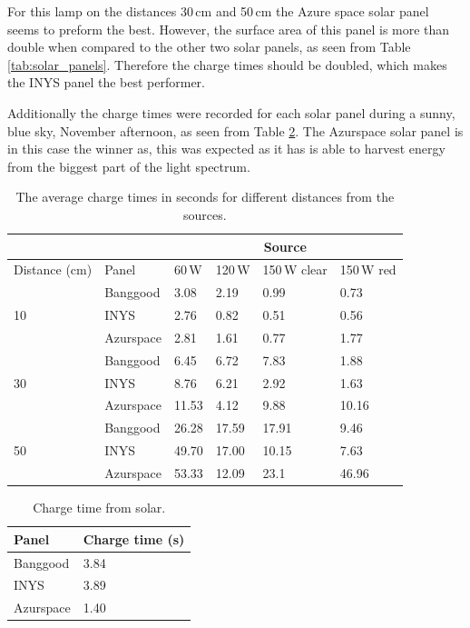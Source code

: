 For this lamp on the distances 30\,cm and 50\,cm the Azure space solar panel seems to preform the best.
However, the surface area of this panel is more than double when compared to the other two solar panels, as seen from Table \ref{tab:solar_panels}.
Therefore the charge times should be doubled, which makes the INYS panel the best performer.

Additionally the charge times were recorded for each solar panel during a sunny, blue sky, November afternoon, as seen from Table \ref{tab:solar_results}.
The Azurspace solar panel is in this case the winner as, this was expected as it has is able to harvest energy from the biggest part of the light spectrum.


\begin{table}[t]
	\centering
	\caption{The average charge times in seconds for different distances from the sources.}
	\label{tab:light_results}
	\begin{tabular}{|l|l||l|l|l|l|}
		\hline
		\multicolumn{2}{|c|}{} & \multicolumn{4}{|c|}{Source} \\
		\hline
		Distance (cm) & Panel & 60\,W & 120\,W & 150\,W clear & 150\,W red \\
		\hline \hline
		\multirow{3}{*}{10} & Banggood & 3.08 & 2.19 & 0.99 & 0.73 \\
		& INYS & 2.76 & 0.82 & 0.51 & 0.56 \\
		& Azurspace & 2.81 & 1.61 & 0.77 & 1.77 \\
		\hline
		\multirow{3}{*}{30} & Banggood & 6.45 & 6.72 & 7.83 & 1.88 \\
		& INYS & 8.76 & 6.21 & 2.92 & 1.63 \\
		& Azurspace& 11.53 & 4.12 & 9.88 & 10.16\\
		\hline
		\multirow{3}{*}{50} & Banggood & 26.28 & 17.59 & 17.91 & 9.46 \\
		& INYS & 49.70 & 17.00 & 10.15 & 7.63 \\
		& Azurspace & 53.33 & 12.09 & 23.1 & 46.96 \\
		\hline
	\end{tabular}
\end{table}

\begin{table}[t]
	\centering
	\caption{Charge time from solar.}
	\label{tab:solar_results}
	\begin{tabular}{|l|l|}
		\hline
		Panel & Charge time (s) \\
		\hline \hline
		Banggood & 3.84\\
		INYS & 3.89\\ 
		Azurspace & 1.40\\
		\hline
	\end{tabular}
\end{table}

